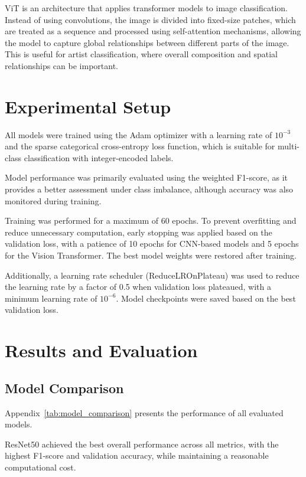 \documentclass[12pt,a4paper]{article}
\begin{document}
ViT is an architecture that applies transformer models to image classification. 
Instead of using convolutions, the image is divided into fixed-size patches, which are treated as a sequence and processed using self-attention mechanisms, allowing the model to capture global relationships between different parts of the image.
This is useful for artist classification, where overall composition and spatial relationships can be important\cite{dosovitskiy2020image}.


\section{Experimental Setup}

All models were trained using the Adam optimizer with a learning rate of $10^{-3}$ and the sparse categorical cross-entropy loss function, which is suitable for multi-class classification with integer-encoded labels.

Model performance was primarily evaluated using the weighted F1-score, as it provides a better assessment under class imbalance, although accuracy was also monitored during training.

Training was performed for a maximum of 60 epochs. 
To prevent overfitting and reduce unnecessary computation, early stopping was applied based on the validation loss, with a patience of 10 epochs for CNN-based models and 5 epochs for the Vision Transformer. 
The best model weights were restored after training.

Additionally, a learning rate scheduler (ReduceLROnPlateau) was used to reduce the learning rate by a factor of 0.5 when validation loss plateaued, with a minimum learning rate of $10^{-6}$.
Model checkpoints were saved based on the best validation loss.

\section{Results and Evaluation}
\subsection{Model Comparison}

Appendix~\ref{tab:model_comparison} presents the performance of all evaluated models.

ResNet50 achieved the best overall performance across all metrics, with the highest F1-score and validation accuracy, while maintaining a reasonable computational cost. 
\end{document}
